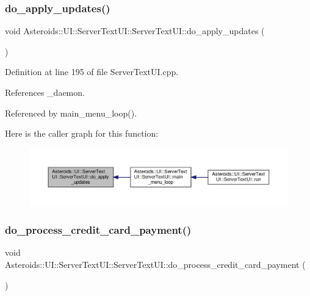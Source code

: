 \subsubsection{\texorpdfstring{do\+\_\+apply\+\_\+updates()}{do\_apply\_updates()}}
{\footnotesize\ttfamily void Asteroids\+::\+U\+I\+::\+Server\+Text\+U\+I\+::\+Server\+Text\+U\+I\+::do\+\_\+apply\+\_\+updates (\begin{DoxyParamCaption}{ }\end{DoxyParamCaption})\hspace{0.3cm}{\ttfamily [private]}}



Definition at line 195 of file Server\+Text\+U\+I.\+cpp.



References \+\_\+daemon.



Referenced by main\+\_\+menu\+\_\+loop().

Here is the caller graph for this function\+:\nopagebreak
\begin{figure}[H]
\begin{center}
\leavevmode
\includegraphics[width=350pt]{classAsteroids_1_1UI_1_1ServerTextUI_1_1ServerTextUI_a35d6eb54e2eabfff2cc1ee47a6c228c6_icgraph}
\end{center}
\end{figure}
\mbox{\label{classAsteroids_1_1UI_1_1ServerTextUI_1_1ServerTextUI_a6713eb173fef32a2fc96932b96ce2dea}} 
\subsubsection{\texorpdfstring{do\+\_\+process\+\_\+credit\+\_\+card\+\_\+payment()}{do\_process\_credit\_card\_payment()}}
{\footnotesize\ttfamily void Asteroids\+::\+U\+I\+::\+Server\+Text\+U\+I\+::\+Server\+Text\+U\+I\+::do\+\_\+process\+\_\+credit\+\_\+card\+\_\+payment (\begin{DoxyParamCaption}{ }\end{DoxyParamCaption})\hspace{0.3cm}{\ttfamily [private]}}



